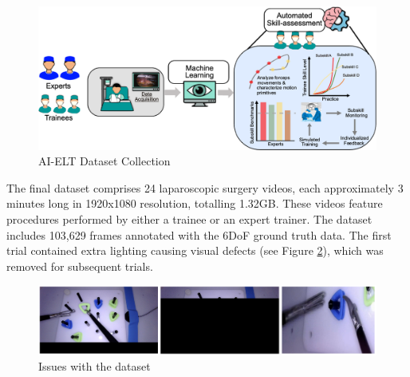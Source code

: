 \begin{figure}[htbp]
    \centering
    \vspace*{-6mm}
    \includegraphics[width=1\linewidth]{dataset_collection.png}
    \vspace*{-6.5mm}
    \caption{AI-ELT Dataset Collection}
    \vspace*{-3mm}
    \label{fig:dataset-collection}
\end{figure}


The final dataset comprises 24 laparoscopic surgery videos, each approximately 3 minutes long in 1920x1080 resolution, totalling 1.32GB. These videos feature procedures performed by either a trainee or an expert trainer. The dataset includes 103,629 frames annotated with the 6DoF ground truth data. The first trial contained extra lighting causing visual defects (see Figure \ref{fig:test1_issues}), which was removed for subsequent trials.

\begin{figure}[htbp]
    \centering
    \vspace{-3mm}
    \includegraphics[width=1\linewidth]{test1_issues}
    \vspace*{-7.5mm}
    \caption{Issues with the dataset}
    \vspace*{-5mm}
    \label{fig:test1_issues}
\end{figure}

